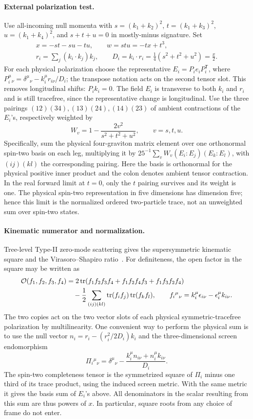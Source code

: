 \documentclass[11pt]{article}
\begin{document}
\paragraph{External polarization test.}
Use all-incoming null momenta with \(s=(k_1+k_2)^2\),
\(t=(k_1+k_3)^2\), \(u=(k_1+k_4)^2\), and \(s+t+u=0\)
in mostly-minus signature. Set
\[
 \begin{gathered}
 x=-st-su-tu,\qquad w=stu=-tx+t^3,\\
 r_i=\sum_j(k_i\cdot k_j)k_j,\qquad
 D_i=k_i\cdot r_i=\tfrac14(s^2+t^2+u^2)=\tfrac{x}{2}.
 \end{gathered}
\]
For each physical polarization choose the representative
\(E_i=P_i e_i P_i^{\mathsf T}\), where
\(P_i^\mu{}_\nu=\delta^\mu{}_\nu-k_i^\mu r_{i\nu}/D_i\);
the transpose notation acts on the second tensor slot. This removes
longitudinal shifts: \(P_i k_i=0\). The field \(E_i\) is transverse to
both \(k_i\) and \(r_i\) and is still tracefree, since the representative
change is longitudinal. Use the three pairings
\((12)(34),(13)(24),(14)(23)\) of ambient contractions of the \(E_i\)'s,
respectively weighted by
\[
 W_v=1-\frac{2v^2}{s^2+t^2+u^2},\qquad v=s,t,u.
\]
Specifically, sum the physical four-graviton matrix element over one
orthonormal spin-two basis on each leg, multiplying it by
\(25^{-1}\sum_{v}W_v(E_i:E_j)(E_k:E_l)\), with \((ij)(kl)\) the
corresponding pairing. Here the basis is orthonormal for the physical
positive inner product and the colon denotes ambient tensor
contraction. In the real forward limit at \(t=0\), only the \(t\)
pairing survives and its weight is one. The physical spin-two
representation in five dimensions has dimension five; hence this
limit is the normalized ordered two-particle trace, not an
unweighted sum over spin-two states.

\paragraph{Kinematic numerator and normalization.}
Tree-level Type-II zero-mode scattering gives the supersymmetric
kinematic square and the Virasoro--Shapiro ratio~\cite{CHLi}.
For definiteness, the open factor in the square may be written as
\[
 \begin{aligned}
 {\cal O}(f_1,f_2,f_3,f_4)
 &=2\,\mathrm{tr}(f_1 f_2 f_3 f_4+f_1 f_2 f_4 f_3+f_1 f_3 f_2 f_4)\\
 &\quad-\frac12\sum_{(ij)(kl)}\mathrm{tr}(f_i f_j)\,\mathrm{tr}(f_k f_l),
 \qquad
 f_i{}^\mu{}_\nu=k_i^\mu\epsilon_{i\nu}-\epsilon_i^\mu k_{i\nu}.
 \end{aligned}
\]
The two copies act on the two vector slots of each physical
symmetric-tracefree polarization by multilinearity. One convenient
way to perform the physical sum is to use the null vector
\(n_i=r_i-(r_i^2/2D_i)k_i\) and the three-dimensional screen
endomorphism
\[
 \Pi_i{}^\mu{}_\nu
 =\delta^\mu{}_\nu-\frac{k_i^\mu n_{i\nu}+n_i^\mu k_{i\nu}}{D_i}.
\]
The spin-two completeness tensor is the symmetrized square of
\(\Pi_i\) minus one third of its trace product, using the induced
screen metric. With the same metric it gives the basis sum of
\(E_i\)'s above. All denominators in the scalar resulting from this
sum are thus powers of \(x\). In particular, square roots from any
choice of frame do not enter.
\end{document}
